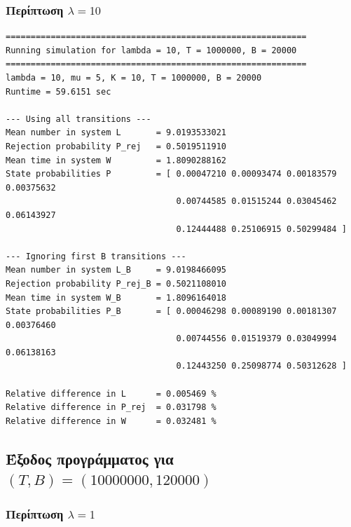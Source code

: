 \documentclass{article}
\begin{document}
\subsubsection*{Περίπτωση $\lambda = 10$}

{
\begin{verbatim}
============================================================
Running simulation for lambda = 10, T = 1000000, B = 20000
============================================================
lambda = 10, mu = 5, K = 10, T = 1000000, B = 20000
Runtime = 59.6151 sec

--- Using all transitions ---
Mean number in system L       = 9.0193533021
Rejection probability P_rej   = 0.5019511910
Mean time in system W         = 1.8090288162
State probabilities P         = [ 0.00047210 0.00093474 0.00183579 0.00375632
                                  0.00744585 0.01515244 0.03045462 0.06143927
                                  0.12444488 0.25106915 0.50299484 ]

--- Ignoring first B transitions ---
Mean number in system L_B     = 9.0198466095
Rejection probability P_rej_B = 0.5021108010
Mean time in system W_B       = 1.8096164018
State probabilities P_B       = [ 0.00046298 0.00089190 0.00181307 0.00376460
                                  0.00744556 0.01519379 0.03049994 0.06138163
                                  0.12443250 0.25098774 0.50312628 ]

Relative difference in L      = 0.005469 %
Relative difference in P_rej  = 0.031798 %
Relative difference in W      = 0.032481 %
\end{verbatim}
}

\subsection{Έξοδος προγράμματος για $(T,B) = (10000000,120000)$}

\subsubsection*{Περίπτωση $\lambda = 1$}
\end{document}
